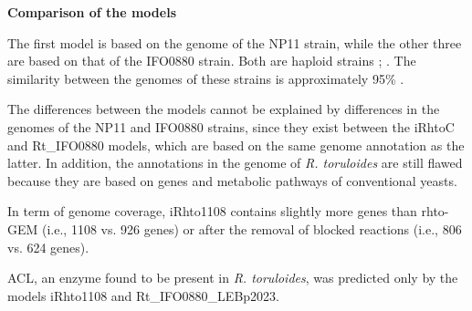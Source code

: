 \textbf{Comparison of the models}

The first model is based on the genome of the NP11 strain, while the other three are based on that of the IFO0880 strain. Both are haploid strains \cite{BANNO1967}; \cite{Zhu2012}. 
The similarity between the genomes of these strains is approximately 95\% \cite{Schultz2022}.

The differences between the models cannot be explained by differences in the genomes of the NP11 and IFO0880 strains, since they exist 
between the iRhtoC and Rt\_IFO0880 models, which are based on the same genome annotation as the latter. In addition, the annotations in 
the genome of \textit{R. toruloides} are still flawed because they are based on genes and metabolic pathways of conventional yeasts. \cite{DeBiaggi2023}

In term of genome coverage, iRhto1108 contains slightly more genes than rhto-GEM (i.e., 1108 vs. 926
genes) or after the removal of blocked reactions (i.e., 806 vs. 624 genes). \cite{Dinh2019}

ACL, an enzyme found to be present in \textit{R. toruloides}, was predicted only by the models iRhto1108 and Rt\_IFO0880\_LEBp2023.













